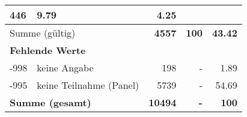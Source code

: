 \begin{longtable}{lXrrr}
       \num{446} &
       \num[round-mode=places,round-precision=2]{9,79} &
         \num[round-mode=places,round-precision=2]{4,25} \\
     \midrule
     \multicolumn{2}{l}{Summe (gültig)} &
       \textbf{\num{4557}} &
     \textbf{100} &
       \textbf{\num[round-mode=places,round-precision=2]{43,42}} \\
     \multicolumn{5}{l}{\textbf{Fehlende Werte}}\\
       -998 &
       keine Angabe &
         \num{198} &
        - &
         \num[round-mode=places,round-precision=2]{1,89} \\
       -995 &
       keine Teilnahme (Panel) &
         \num{5739} &
        - &
         \num[round-mode=places,round-precision=2]{54,69} \\
     \midrule
     \multicolumn{2}{l}{\textbf{Summe (gesamt)}} &
          \textbf{\num{10494}} &
        \textbf{-} &
        \textbf{100} \\
     \bottomrule
     \end{longtable}
     
